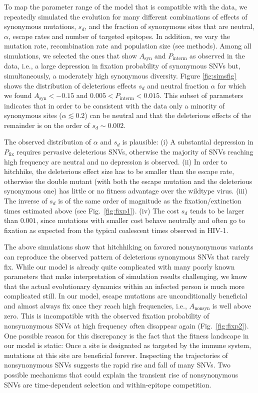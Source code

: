 \documentclass[11pt]{article}
\newcommand{\pfix}{P_{\mathrm{fix}}}
\newcommand{\FIG}[1]{Fig.~\ref{fig:#1}}
\begin{document}
To map the parameter range of the model that is compatible with the data, we
repeatedly simulated the evolution for many different combinations of
effects of synonymous mutations, $s_d$, and the fraction of synonymous
sites that are neutral, $\alpha$, escape rates and number of targeted epitopes. In
addition, we vary the mutation rate, recombination rate and population
size (see methods).  Among all simulations, we selected the ones
that show $A_\text{syn}$ and $P_\text{interm}$ as observed in the data, i.e., a
large depression in fixation probability of synonymous SNVs but, simultaneously,
a moderately high synonymous diversity. Figure \ref{fig:simsfig} shows
the distribution of deleterious effects $s_d$ and neutral fraction
$\alpha$ for which we found $A_\text{syn} < -0.15$ and $0.005 <
P_\text{interm} < 0.015$. This subset of parameters indicates that in
order to be consistent with the data only
a minority of synonymous sites ($\alpha \lesssim 0.2$) can be neutral  and that
the deleterious effects of the remainder is on the order of $s_d \sim
0.002$. 

The observed distribution of $\alpha$ and $s_d$ is plausible:
(i) A substantial depression in $\pfix$ requires pervasive deleterious SNVs, otherwise
the majority of SNVs reaching high frequency are neutral and no depression is
observed. (ii) In order to hitchhike, the deleterious effect size has to be 
smaller than the escape rate, otherwise the double mutant (with both the escape
mutation and the deleterious synonymous one) has little or no fitness advantage
over the wildtype virus. (iii) The inverse of $s_d$ is of the same order of magnitude as the
fixation/extinction times estimated above (see \FIG{fixp1}). (iv)
The cost $s_d$ tends to be larger than $0.001$, since mutations with smaller
cost behave neutrally and often go to fixation
as expected from the typical coalescent times observed in HIV-1.


The above simulations show that hitchhiking on favored nonsynonymous
variants can reproduce the observed pattern of deleterious synonymous SNVs that
rarely fix. While our model is already quite complicated with many
poorly known parameters that make interpretation of simulation results
challenging, we know that the actual evolutionary dynamics within an
infected person is much more complicated still. In our model, 
 escape mutations are unconditionally beneficial and almost
always fix once they reach high frequencies, i.e., $A_{\mathrm{nonsyn}}$ is well
above zero. This is incompatible with the observed fixation probability of
nonsynonymous SNVs at high frequency often disappear again
(\FIG{fixp2}). One possible reason for this discrepancy is the fact that
the fitness landscape in our model is static: Once a site is designated
as targeted by the immune system, mutations at this site are beneficial
forever. Inspecting the trajectories of
nonsynonymous SNVs suggests the rapid rise and fall of many SNVs. Two
possible mechanisms that could explain the transient rise of
nonsynonymous SNVs are time-dependent selection and within-epitope competition.
\end{document}
